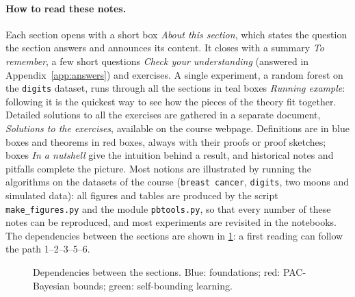 \documentclass[11pt,a4paper]{article}
\numberwithin{equation}{section}
\begin{document}
\paragraph{How to read these notes.}
Each section opens with a short box \emph{About this section}, which states
the question the section answers and announces its content. It closes with a
summary \emph{To remember}, a few short questions \emph{Check your
understanding} (answered in Appendix~\ref{app:answers}) and exercises. A single
experiment, a random forest on the \texttt{digits} dataset, runs through all the
sections in teal boxes \emph{Running example}: following it is the quickest way
to see how the pieces of the theory fit together. Detailed solutions to all the exercises are gathered in a
separate document, \emph{Solutions to the exercises}, available on the course webpage. Definitions are in blue boxes and theorems in red boxes, always with
their proofs or proof sketches; boxes \emph{In a nutshell} give the intuition
behind a result, and historical notes and pitfalls complete the picture. Most
notions are illustrated by running the algorithms on the datasets of the course
(\texttt{breast cancer}, \texttt{digits}, two moons and simulated data): all
figures and tables are produced by the script \texttt{make\_figures.py} and the
module \texttt{pbtools.py}, so that every number of these notes can be
reproduced, and most experiments are revisited in the notebooks. The dependencies between the sections are shown in
\cref{fig:roadmap}: a first reading can follow the path 1--2--3--5--6.

\begin{figure}[h]
\centering
{}
\caption{Dependencies between the sections. Blue: foundations; red: PAC-Bayesian bounds; green: self-bounding learning.}
\label{fig:roadmap}
\end{figure}
\end{document}
